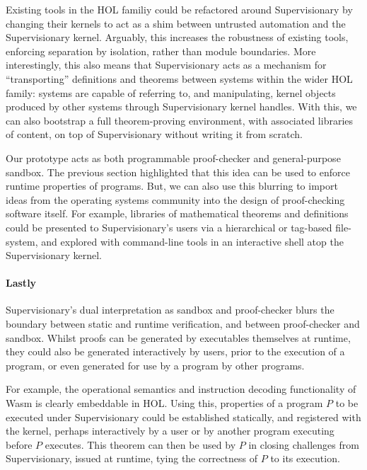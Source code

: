 \documentclass[sigplan, review]{acmart}
\begin{document}
Existing tools in the HOL familiy could be refactored around Supervisionary by changing their kernels to act as a shim between untrusted automation and the Supervisionary kernel.
Arguably, this increases the robustness of existing tools, enforcing separation by isolation, rather than module boundaries.
More interestingly, this also means that Supervisionary acts as a mechanism for ``transporting'' definitions and theorems between systems within the wider HOL family: systems are capable of referring to, and manipulating, kernel objects produced by other systems through Supervisionary kernel handles.
With this, we can also bootstrap a full theorem-proving environment, with associated libraries of content, on top of Supervisionary without writing it from scratch.

Our prototype acts as both programmable proof-checker and general-purpose sandbox.
The previous section highlighted that this idea can be used to enforce runtime properties of programs.
But, we can also use this blurring to import ideas from the operating systems community into the design of proof-checking software itself.
For example, libraries of mathematical theorems and definitions could be presented to Supervisionary's users via a hierarchical or tag-based file-system, and explored with command-line tools in an interactive shell atop the Supervisionary kernel.

\paragraph{Lastly}

Supervisionary's dual interpretation as sandbox and proof-checker blurs the boundary between static and runtime verification, and between proof-checker and sandbox.
Whilst proofs can be generated by executables themselves at runtime, they could also be generated interactively by users, prior to the execution of a program, or even generated for use by a program by other programs.

For example, the operational semantics and instruction decoding functionality of Wasm is clearly embeddable in HOL.
Using this, properties of a program $P$ to be executed under Supervisionary could be established statically, and registered with the kernel, perhaps interactively by a user or by another program executing before $P$ executes.
This theorem can then be used by $P$ in closing challenges from Supervisionary, issued at runtime, tying the correctness of $P$ to its execution.
\end{document}
